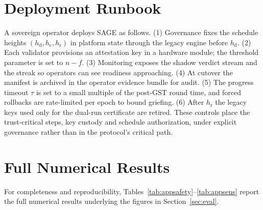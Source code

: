 \documentclass[journal]{IEEEtran}
\theoremstyle{definition}
\theoremstyle{remark}
\begin{document}
\section{Deployment Runbook}
\label{app:runbook}
A sovereign operator deploys SAGE as follows. (1) Governance fixes the schedule heights
$(h_{\mathrm{d}},h_{\mathrm{c}},h_{\mathrm{r}})$ in platform state through the legacy engine
before $h_{\mathrm{d}}$. (2) Each validator provisions an attestation key in a hardware module;
the threshold parameter is set to $n-f$. (3) Monitoring exposes the shadow verdict stream and
the streak so operators can see readiness approaching. (4) At cutover the manifest is archived in
the operator evidence bundle for audit. (5) The progress timeout $\tau$ is set to a small
multiple of the post-GST round time, and forced rollbacks are rate-limited per epoch to bound
griefing. (6) After $h_{\mathrm{r}}$ the legacy keys used only for the dual-run certificate are
retired. These controls place the trust-critical steps, key custody and schedule authorization,
under explicit governance rather than in the protocol's critical path.

\section{Full Numerical Results}
\label{app:data}
For completeness and reproducibility, Tables~\ref{tab:appsafety}--\ref{tab:appsens} report the
full numerical results underlying the figures in Section~\ref{sec:eval}.
\end{document}
